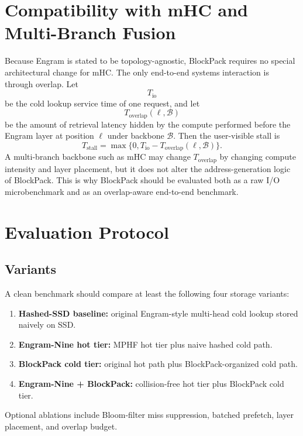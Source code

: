 \documentclass[11pt]{article}
\begin{document}
\section{Compatibility with mHC and Multi-Branch Fusion}
Because Engram is stated to be topology-agnostic, BlockPack requires no special architectural change for mHC. The only end-to-end systems interaction is through overlap. Let
\[
T_{\mathrm{io}}
\]
be the cold lookup service time of one request, and let
\[
T_{\mathrm{overlap}}(\ell, \mathcal{B})
\]
be the amount of retrieval latency hidden by the compute performed before the Engram layer at position $\ell$ under backbone $\mathcal{B}$. Then the user-visible stall is
\[
T_{\mathrm{stall}} = \max\{0, T_{\mathrm{io}} - T_{\mathrm{overlap}}(\ell, \mathcal{B})\}.
\]
A multi-branch backbone such as mHC may change $T_{\mathrm{overlap}}$ by changing compute intensity and layer placement, but it does not alter the address-generation logic of BlockPack. This is why BlockPack should be evaluated both as a raw I/O microbenchmark and as an overlap-aware end-to-end benchmark.

\section{Evaluation Protocol}
\subsection{Variants}
A clean benchmark should compare at least the following four storage variants:
\begin{enumerate}[leftmargin=1.5em]
    \item \textbf{Hashed-SSD baseline:} original Engram-style multi-head cold lookup stored naively on SSD.
    \item \textbf{Engram-Nine hot tier:} MPHF hot tier plus naive hashed cold path.
    \item \textbf{BlockPack cold tier:} original hot path plus BlockPack-organized cold path.
    \item \textbf{Engram-Nine + BlockPack:} collision-free hot tier plus BlockPack cold tier.
\end{enumerate}
Optional ablations include Bloom-filter miss suppression, batched prefetch, layer placement, and overlap budget.
\end{document}
